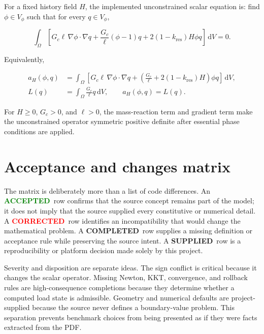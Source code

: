 \documentclass[11pt,a4paper]{article}
\newcommand{\AcceptedTag}{\colorbox{PaleTeal}{\textcolor{Green}{\scriptsize\bfseries ACCEPTED}}}
\newcommand{\CorrectedTag}{\colorbox{PaleRed}{\textcolor{Red}{\scriptsize\bfseries CORRECTED}}}
\newcommand{\CompletedTag}{\colorbox{PaleAmber}{\textcolor{Amber}{\scriptsize\bfseries COMPLETED}}}
\newcommand{\AddedTag}{\colorbox{PaleGray}{\textcolor{Slate}{\scriptsize\bfseries SUPPLIED}}}
\begin{document}
For a fixed history field $H$, the implemented unconstrained scalar equation is:
find $\phi\in V_\phi$ such that for every $q\in V_\phi$,

\begin{equation}
\boxed{
  \int_\Omega\left[
    G_c\ell\,\nabla\phi\!\cdot\nabla q
    +\frac{G_c}{\ell}(\phi-1)q
    +2(1-k_{\mathrm{res}})H\phi q
  \right]\,\mathrm{d}V=0.}
  \label{eq:implemented-phase-weak}
\end{equation}

Equivalently,

\begin{align}
  a_H(\phi,q)
    &=\int_\Omega\left[
       G_c\ell\,\nabla\phi\!\cdot\nabla q
       +\left(\frac{G_c}{\ell}
          +2(1-k_{\mathrm{res}})H\right)\phi q
      \right]\,\mathrm{d}V, \\
  L(q)&=\int_\Omega\frac{G_c}{\ell}q\,\mathrm{d}V,
  \qquad a_H(\phi,q)=L(q).
  \label{eq:phase-bilinear}
\end{align}

For $H\ge0$, $G_c>0$, and $\ell>0$, the mass-reaction term and gradient term
make the unconstrained operator symmetric positive definite after essential
phase conditions are applied.

\section{Acceptance and changes matrix}

The matrix is deliberately more than a list of code differences. An
\AcceptedTag\ row confirms that the source concept remains part of the model;
it does not imply that the source supplied every constitutive or numerical
detail. A \CorrectedTag\ row identifies an incompatibility that would change
the mathematical problem. A \CompletedTag\ row supplies a missing definition
or acceptance rule while preserving the source intent. A \AddedTag\ row is a
reproducibility or platform decision made solely by this project.

Severity and disposition are separate ideas. The sign conflict is critical
because it changes the scalar operator. Missing Newton, KKT, convergence, and
rollback rules are high-consequence completions because they determine whether
a computed load state is admissible. Geometry and numerical defaults are
project-supplied because the source never defines a boundary-value problem.
This separation prevents benchmark choices from being presented as if they
were facts extracted from the PDF.
\end{document}
